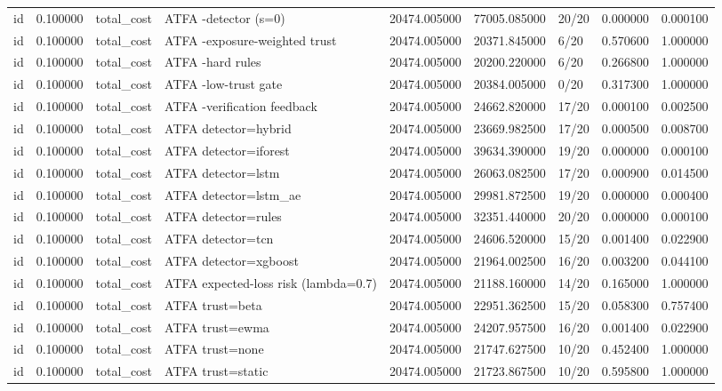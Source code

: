 \begin{tabular}{lrllrrlrr}
id & 0.100000 & total\_cost & ATFA -detector (s=0) & 20474.005000 & 77005.085000 & 20/20 & 0.000000 & 0.000100 \\
id & 0.100000 & total\_cost & ATFA -exposure-weighted trust & 20474.005000 & 20371.845000 & 6/20 & 0.570600 & 1.000000 \\
id & 0.100000 & total\_cost & ATFA -hard rules & 20474.005000 & 20200.220000 & 6/20 & 0.266800 & 1.000000 \\
id & 0.100000 & total\_cost & ATFA -low-trust gate & 20474.005000 & 20384.005000 & 0/20 & 0.317300 & 1.000000 \\
id & 0.100000 & total\_cost & ATFA -verification feedback & 20474.005000 & 24662.820000 & 17/20 & 0.000100 & 0.002500 \\
id & 0.100000 & total\_cost & ATFA detector=hybrid & 20474.005000 & 23669.982500 & 17/20 & 0.000500 & 0.008700 \\
id & 0.100000 & total\_cost & ATFA detector=iforest & 20474.005000 & 39634.390000 & 19/20 & 0.000000 & 0.000100 \\
id & 0.100000 & total\_cost & ATFA detector=lstm & 20474.005000 & 26063.082500 & 17/20 & 0.000900 & 0.014500 \\
id & 0.100000 & total\_cost & ATFA detector=lstm\_ae & 20474.005000 & 29981.872500 & 19/20 & 0.000000 & 0.000400 \\
id & 0.100000 & total\_cost & ATFA detector=rules & 20474.005000 & 32351.440000 & 20/20 & 0.000000 & 0.000100 \\
id & 0.100000 & total\_cost & ATFA detector=tcn & 20474.005000 & 24606.520000 & 15/20 & 0.001400 & 0.022900 \\
id & 0.100000 & total\_cost & ATFA detector=xgboost & 20474.005000 & 21964.002500 & 16/20 & 0.003200 & 0.044100 \\
id & 0.100000 & total\_cost & ATFA expected-loss risk (lambda=0.7) & 20474.005000 & 21188.160000 & 14/20 & 0.165000 & 1.000000 \\
id & 0.100000 & total\_cost & ATFA trust=beta & 20474.005000 & 22951.362500 & 15/20 & 0.058300 & 0.757400 \\
id & 0.100000 & total\_cost & ATFA trust=ewma & 20474.005000 & 24207.957500 & 16/20 & 0.001400 & 0.022900 \\
id & 0.100000 & total\_cost & ATFA trust=none & 20474.005000 & 21747.627500 & 10/20 & 0.452400 & 1.000000 \\
id & 0.100000 & total\_cost & ATFA trust=static & 20474.005000 & 21723.867500 & 10/20 & 0.595800 & 1.000000 \\

\end{tabular}
